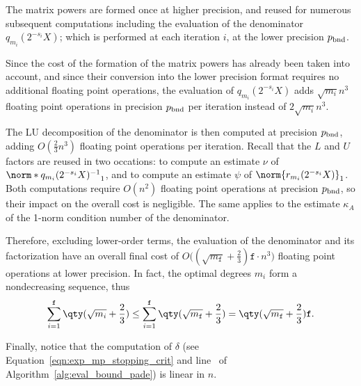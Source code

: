 %	


The matrix powers are formed once at higher precision, and reused for numerous subsequent computations including the evaluation of the denominator $q_{m_i}(2^{-s_i}X)$; which is performed at each iteration $i$, at the lower precision $p_{\textup{bnd}}$.

Since the cost of the formation of the matrix powers has already been taken into account, and since their conversion into the lower precision format requires no additional floating point operations, the evaluation of $q_{m_i}(2^{-s_i}X)$ adds $\sqrt{m_i}n^3$ floating point operations in precision ${p_{\textup{bnd}}}$ per iteration instead of $2\sqrt{m_i}n^3$.

The LU decomposition of the denominator is then computed at precision $p_{\textup{bnd}}$, adding $O(\frac{2}{3}n^3)$ floating point operations per iteration. Recall that the $L$ and $U$ factors are reused in two occations: to compute an estimate $\nu$ of $\norm*{q_{m_i}(2^{-s_i}X)^{-1}}_1$, and to compute an estimate $\psi$ of $\norm{r_{m_i}(2^{-s_i}X)}_1$. Both computations require $O(n^2)$ floating point operations at precision $p_{\textup{bnd}}$, so their impact on the overall cost is negligible. The same applies to the estimate $\kappa_A$ of the 1-norm condition number of the denominator.

Therefore, excluding lower-order terms, the evaluation of the denominator and its factorization have an overall final cost of $O\big((\sqrt{m_{\mathtt{f}}}+\frac{2}{3})\mathtt{f}\cdot n^3\big)$ floating point operations at lower precision. In fact, the optimal degrees $m_i$ form a nondecreasing sequence, thus
\[
	\sum_{i=1}^{\mathtt{f}}\qty(\sqrt{m_i}+\frac{2}{3})\le
	\sum_{i=1}^{\mathtt{f}}\qty(\sqrt{m_{\mathtt{f}}}+\frac{2}{3})=
	\qty(\sqrt{m_{\mathtt{f}}}+\frac{2}{3})\mathtt{f}.
\]	

Finally, notice that the computation of $\delta$ (see Equation~\eqref{eqn:exp_mp_stopping_crit} and line~ of Algorithm~\ref{alg:eval_bound_pade}) is linear in $n$.

